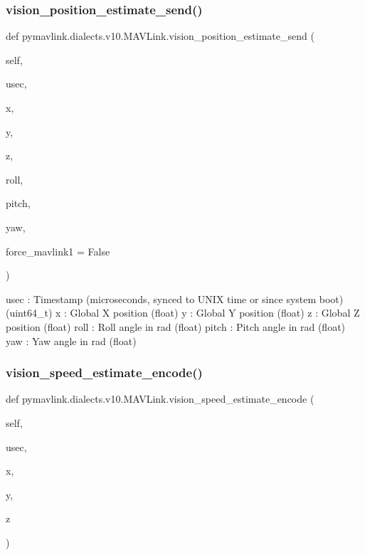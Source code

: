 \begin{DoxyVerb}
\begin{DoxyVerb}
\begin{DoxyVerb}
\begin{DoxyVerb}
\begin{DoxyVerb}
\begin{DoxyVerb}
\begin{DoxyVerb}
\begin{DoxyVerb}
\begin{DoxyVerb}
\begin{DoxyVerb}
\subsubsection{\texorpdfstring{vision\+\_\+position\+\_\+estimate\+\_\+send()}{vision\_position\_estimate\_send()}}
{\footnotesize\ttfamily def pymavlink.\+dialects.\+v10.\+M\+A\+V\+Link.\+vision\+\_\+position\+\_\+estimate\+\_\+send (\begin{DoxyParamCaption}\item[{}]{self,  }\item[{}]{usec,  }\item[{}]{x,  }\item[{}]{y,  }\item[{}]{z,  }\item[{}]{roll,  }\item[{}]{pitch,  }\item[{}]{yaw,  }\item[{}]{force\+\_\+mavlink1 = {\ttfamily False} }\end{DoxyParamCaption})}

\begin{DoxyVerb}usec                      : Timestamp (microseconds, synced to UNIX time or since system boot) (uint64_t)
x                         : Global X position (float)
y                         : Global Y position (float)
z                         : Global Z position (float)
roll                      : Roll angle in rad (float)
pitch                     : Pitch angle in rad (float)
yaw                       : Yaw angle in rad (float)\end{DoxyVerb}
 \mbox{\label{classpymavlink_1_1dialects_1_1v10_1_1MAVLink_a069128ac7552ff1cbbf67bae6586a025}} 
\subsubsection{\texorpdfstring{vision\+\_\+speed\+\_\+estimate\+\_\+encode()}{vision\_speed\_estimate\_encode()}}
{\footnotesize\ttfamily def pymavlink.\+dialects.\+v10.\+M\+A\+V\+Link.\+vision\+\_\+speed\+\_\+estimate\+\_\+encode (\begin{DoxyParamCaption}\item[{}]{self,  }\item[{}]{usec,  }\item[{}]{x,  }\item[{}]{y,  }\item[{}]{z }\end{DoxyParamCaption})}


\end{DoxyVerb}
\end{DoxyVerb}
\end{DoxyVerb}
\end{DoxyVerb}
\end{DoxyVerb}
\end{DoxyVerb}
\end{DoxyVerb}
\end{DoxyVerb}
\end{DoxyVerb}
\end{DoxyVerb}
